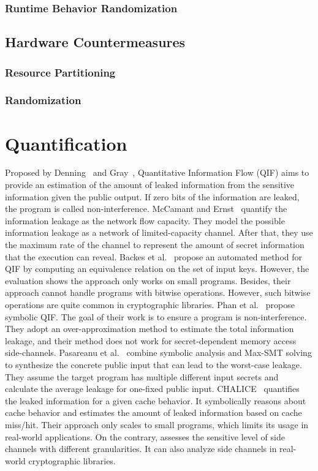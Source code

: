 \subsubsection*{Runtime Behavior Randomization}

\subsection{Hardware Countermeasures}
\subsubsection*{Resource Partitioning}
\subsubsection*{Randomization}

\section{Quantification}
Proposed by Denning~\cite{robling1982cryptography} and Gray~\cite{gray1992toward},
Quantitative Information Flow (QIF) aims to provide an estimation of the amount of leaked information from the sensitive information given the public output. If zero bits
of the information are leaked, the program is called non-interference. 
McCamant and Ernst~\cite{McCamantE2008} quantify the information leakage as the network
flow capacity. They model the possible information leakage as a network of limited-capacity
channel. After that, they use the maximum rate of the channel to represent the amount of secret information that the execution can reveal.
Backes et al.~\cite{5207642} propose an automated method for QIF
by computing an equivalence relation on the set of input keys. However,
the evaluation shows the approach only works on small programs.
Besides, their approach cannot handle programs with bitwise operations.
However, such bitwise operations are quite common in cryptographic libraries.
Phan et al.~\cite{Phan:2012:SQI:2382756.2382791} propose symbolic QIF. The goal of their
work is to ensure a program is non-interference. They adopt an over-approximation method to estimate the total information leakage, and their method
does not work for secret-dependent memory access side-channels.
Pasareanu et al.~\cite{pasareanu2016multi} combine symbolic analysis and Max-SMT solving to synthesize the concrete public input that can lead to the worst-case leakage. They assume the target program has multiple different input secrets and calculate the average leakage for one-fixed public input.
CHALICE~\cite{Chattopadhyay:2017:QIL:3127041.3127044} quantifies the leaked
information for a given cache behavior.
It symbolically reasons about cache
behavior and estimates the amount of leaked information based on cache miss/hit.
Their approach only scales to small programs, which limits its usage in
real-world applications. On the contrary, \tool{} assesses the sensitive level
of side channels with different granularities. It can also analyze side channels in real-world cryptographic libraries.

